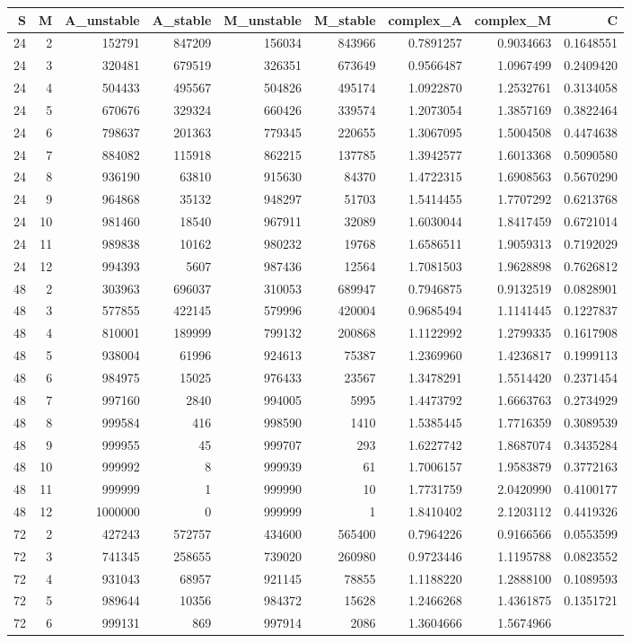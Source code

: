 \documentclass[]{article}
\begin{document}
\begin{longtable}[]{@{}rrrrrrrrr@{}}
\toprule
S & M & A\_unstable & A\_stable & M\_unstable & M\_stable & complex\_A &
complex\_M & C\tabularnewline
\midrule
\endhead
24 & 2 & 152791 & 847209 & 156034 & 843966 & 0.7891257 & 0.9034663 &
0.1648551\tabularnewline
24 & 3 & 320481 & 679519 & 326351 & 673649 & 0.9566487 & 1.0967499 &
0.2409420\tabularnewline
24 & 4 & 504433 & 495567 & 504826 & 495174 & 1.0922870 & 1.2532761 &
0.3134058\tabularnewline
24 & 5 & 670676 & 329324 & 660426 & 339574 & 1.2073054 & 1.3857169 &
0.3822464\tabularnewline
24 & 6 & 798637 & 201363 & 779345 & 220655 & 1.3067095 & 1.5004508 &
0.4474638\tabularnewline
24 & 7 & 884082 & 115918 & 862215 & 137785 & 1.3942577 & 1.6013368 &
0.5090580\tabularnewline
24 & 8 & 936190 & 63810 & 915630 & 84370 & 1.4722315 & 1.6908563 &
0.5670290\tabularnewline
24 & 9 & 964868 & 35132 & 948297 & 51703 & 1.5414455 & 1.7707292 &
0.6213768\tabularnewline
24 & 10 & 981460 & 18540 & 967911 & 32089 & 1.6030044 & 1.8417459 &
0.6721014\tabularnewline
24 & 11 & 989838 & 10162 & 980232 & 19768 & 1.6586511 & 1.9059313 &
0.7192029\tabularnewline
24 & 12 & 994393 & 5607 & 987436 & 12564 & 1.7081503 & 1.9628898 &
0.7626812\tabularnewline
48 & 2 & 303963 & 696037 & 310053 & 689947 & 0.7946875 & 0.9132519 &
0.0828901\tabularnewline
48 & 3 & 577855 & 422145 & 579996 & 420004 & 0.9685494 & 1.1141445 &
0.1227837\tabularnewline
48 & 4 & 810001 & 189999 & 799132 & 200868 & 1.1122992 & 1.2799335 &
0.1617908\tabularnewline
48 & 5 & 938004 & 61996 & 924613 & 75387 & 1.2369960 & 1.4236817 &
0.1999113\tabularnewline
48 & 6 & 984975 & 15025 & 976433 & 23567 & 1.3478291 & 1.5514420 &
0.2371454\tabularnewline
48 & 7 & 997160 & 2840 & 994005 & 5995 & 1.4473792 & 1.6663763 &
0.2734929\tabularnewline
48 & 8 & 999584 & 416 & 998590 & 1410 & 1.5385445 & 1.7716359 &
0.3089539\tabularnewline
48 & 9 & 999955 & 45 & 999707 & 293 & 1.6227742 & 1.8687074 &
0.3435284\tabularnewline
48 & 10 & 999992 & 8 & 999939 & 61 & 1.7006157 & 1.9583879 &
0.3772163\tabularnewline
48 & 11 & 999999 & 1 & 999990 & 10 & 1.7731759 & 2.0420990 &
0.4100177\tabularnewline
48 & 12 & 1000000 & 0 & 999999 & 1 & 1.8410402 & 2.1203112 &
0.4419326\tabularnewline
72 & 2 & 427243 & 572757 & 434600 & 565400 & 0.7964226 & 0.9166566 &
0.0553599\tabularnewline
72 & 3 & 741345 & 258655 & 739020 & 260980 & 0.9723446 & 1.1195788 &
0.0823552\tabularnewline
72 & 4 & 931043 & 68957 & 921145 & 78855 & 1.1188220 & 1.2888100 &
0.1089593\tabularnewline
72 & 5 & 989644 & 10356 & 984372 & 15628 & 1.2466268 & 1.4361875 &
0.1351721\tabularnewline
72 & 6 & 999131 & 869 & 997914 & 2086 & 1.3604666 & 1.5674966 &

\end{longtable}
\end{document}
